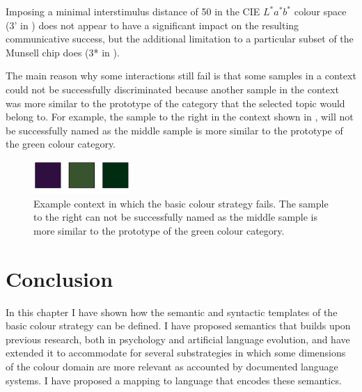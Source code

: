 Imposing a minimal interstimulus distance of 50 in the CIE $L^*a^*b^*$
colour space (3' in ) does not
appear to have a significant impact on the resulting communicative
success, but the additional limitation to a particular subset of the
Munsell chip does (3* in ).

The main reason why some interactions still fail is that some samples
in a context could not be successfully discriminated because another
sample in the context was more similar to the prototype of the
category that the selected topic would belong to. For example, the
sample to the right in the context shown in , will not be successfully named as
the middle sample is more similar to the prototype of the green colour
category.

\begin{figure}[H]
  \begin{center}
    \includegraphics[height=1.25cm]{./basic-strategy/figures/baseline-failure-context.pdf}
    \caption[Example context in which the basic colour strategy
    fails]{Example context in which the basic colour strategy
      fails. The sample to the right can not be successfully named as
      the middle sample is more similar to the prototype of the green
      colour category.}
    \label{f:bcs-failure-context}
  \end{center}
\end{figure}

\section{Conclusion}

In this chapter I have shown how the semantic and syntactic templates
of the basic colour strategy can be defined. I have proposed
semantics that builds upon previous research, both in psychology and
artificial language evolution, and have extended it to accommodate for
several substrategies in which some dimensions of the colour domain
are more relevant as accounted by documented language systems. I have
proposed a mapping to language that encodes these semantics.
